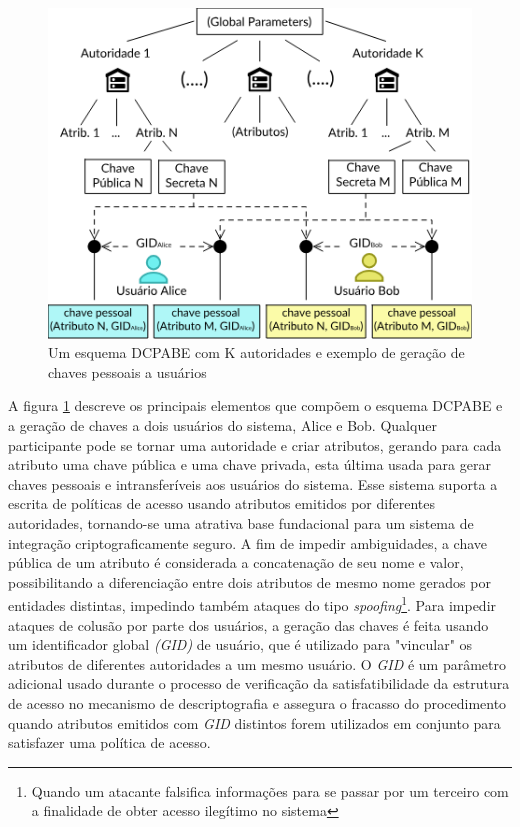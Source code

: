 \documentclass[a4paper,11pt]{article}
\begin{document}
\begin{figure}[!h]
  \centering
  \includegraphics[width=\textwidth]{images/diagrama-DCPABE.png}
  \caption{Um esquema DCPABE com K autoridades e exemplo de geração de chaves pessoais a usuários}
  \label{fig:diagramaDCPABE}
\end{figure}

A figura \ref{fig:diagramaDCPABE} descreve os principais elementos que compõem o esquema DCPABE e a geração de chaves a dois usuários do sistema, Alice e Bob.
Qualquer participante pode se tornar uma autoridade e criar atributos, gerando para cada atributo uma chave pública e uma chave privada, esta última usada para gerar chaves pessoais e intransferíveis aos usuários do sistema.
Esse sistema suporta a escrita de políticas de acesso usando atributos emitidos por diferentes autoridades, tornando-se uma atrativa base fundacional para um sistema de integração criptograficamente seguro.
A fim de impedir ambiguidades, a chave pública de um atributo é considerada a concatenação de seu nome e valor, possibilitando a diferenciação entre dois atributos de mesmo nome gerados por entidades distintas, impedindo também ataques do tipo \emph{spoofing}\footnote{Quando um atacante falsifica informações para se passar por um terceiro com a finalidade de obter acesso ilegítimo no sistema}.
Para impedir ataques de colusão por parte dos usuários, a geração das chaves é feita usando um identificador global \emph{(GID)} de usuário, que é utilizado para "vincular" os atributos de diferentes autoridades a um mesmo usuário. %
O \emph{GID} é um parâmetro adicional usado durante o processo de verificação da satisfatibilidade da estrutura de acesso no mecanismo de descriptografia e assegura o fracasso do procedimento quando atributos emitidos com \emph{GID} distintos forem utilizados em conjunto para satisfazer uma política de acesso.
\end{document}
